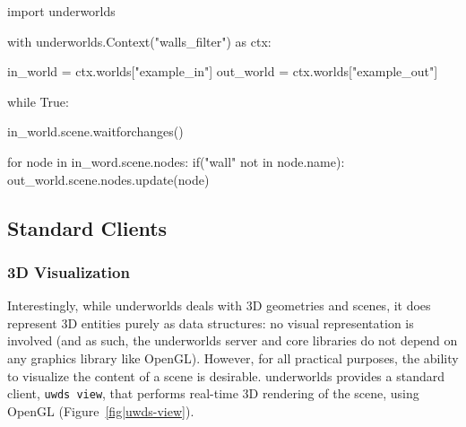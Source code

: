 \documentclass[letterpaper, 10 pt, conference]{ieeeconf}  %
\newcommand{\uwds}{{\sc underworlds}\xspace}
\begin{document}
\begin{listing}[h!]

\begin{pythoncode}
import underworlds

with underworlds.Context("walls_filter") as ctx:

    in_world = ctx.worlds["example_in"]
    out_world = ctx.worlds["example_out"]

    while True:

        in_world.scene.waitforchanges()

        for node in in_word.scene.nodes:
            if("wall" not in node.name):
                out_world.scene.nodes.update(node)


\end{pythoncode}
    \caption{Example of a simple \uwds filter, written in Python, and named {\tt
    walls\_filter}: the client connects to the \uwds network, walkthrough the
    scene graph of world {\tt example\_in}, filter out some objects, and publish
    the remaining objects in the world {\tt example\_out}.}
    
    \label{lst|pythonapi}
\end{listing}

\subsection{Standard Clients}
\label{std_clients}

\subsubsection{3D Visualization}

Interestingly, while \uwds deals with 3D geometries and scenes, it does
represent 3D entities purely as data structures: no visual representation is
involved (and as such, the \uwds server and core libraries do not depend on any
graphics library like OpenGL). However, for all practical purposes, the ability
to visualize the content of a scene is desirable. \uwds provides a standard
client, {\tt uwds view}, that performs real-time 3D rendering of the scene,
using OpenGL (Figure~\ref{fig|uwds-view}).
\end{document}
